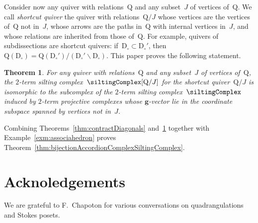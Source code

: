 \documentclass{amsart}
\newtheorem{theorem}{Theorem}%
\theoremstyle{definition}
\renewcommand{\b}[1]{\mathbf{#1}} %
\newcommand{\ssm}{\smallsetminus} %
\newcommand{\darkblue}{\color{darkblue}} %
\newcommand{\defn}[1]{\textsl{\darkblue #1}} %
\newcommand{\vincent}[1]{\todo[color=blue!30]{#1 \\ \hfill --- V.}}
\newcommand{\dissection}{\mathrm{D}} %
\newcommand{\quiver}{\mathrm{Q}} %
\begin{document}
Consider now any quiver with relations~$\quiver$ and any subset~$J$ of vertices of~$\quiver$.
We call \defn{shortcut quiver} the quiver with relations~$\quiver/J$ whose vertices are the vertices of~$\quiver$ not in~$J$, whose arrows are the paths in~$\quiver$ with internal vertices in~$J$, and whose relations are inherited from those of~$\quiver$.
For example, quivers of subdissections are shortcut quivers: if~$\dissection_\circ \subset \dissection_\circ'$, then~${\quiver(\dissection_\circ) = \quiver(\dissection_\circ')/(\dissection_\circ' \ssm \dissection_\circ)}$.
This paper proves the following statement.

\begin{theorem}
\label{thm:contractVertices}
For any quiver with relations~$\quiver$ and any subset~$J$ of vertices of~$\quiver$, the $2$-term silting complex~$\siltingComplex[\quiver/J]$ for the shortcut quiver~$\quiver/J$ is isomorphic to the subcomplex of the $2$-term silting complex~$\siltingComplex$ induced by $2$-term projective complexes whose $\b{g}$-vector lie in the coordinate subspace spanned by vertices not in~$J$.
\end{theorem}

Combining Theorems~\ref{thm:contractDiagonals} and~\ref{thm:contractVertices} together with Example~\ref{exm:associahedron} proves Theorem~\ref{thm:bijectionAccordionComplexSiltingComplex}.

\vincent{Fans}



\section*{Acknoledgements}

We are grateful to F.~Chapoton for various conversations on quadrangulations and Stokes posets.




\label{sec:biblio}
\end{document}
